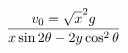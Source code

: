 \documentclass[preview]{standalone}
\begin{document}
\begin{align*}
{\displaystyle v_{0}={\sqrt  x^{2}g} \over {x\sin 2\theta -2y\cos ^{2}\theta  }}
\end{align*}
\end{document}
